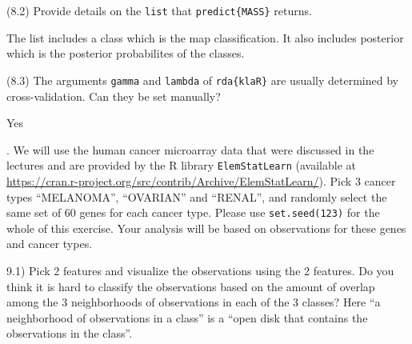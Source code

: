 \documentclass[
  11pt,
]{article}
\newenvironment{Shaded}{\begin{snugshade}}{\end{snugshade}}
\newcommand{\AttributeTok}[1]{\textcolor[rgb]{0.77,0.63,0.00}{#1}}
\newcommand{\ConstantTok}[1]{\textcolor[rgb]{0.00,0.00,0.00}{#1}}
\newcommand{\DecValTok}[1]{\textcolor[rgb]{0.00,0.00,0.81}{#1}}
\newcommand{\FunctionTok}[1]{\textcolor[rgb]{0.00,0.00,0.00}{#1}}
\newcommand{\NormalTok}[1]{#1}
\newcommand{\OtherTok}[1]{\textcolor[rgb]{0.56,0.35,0.01}{#1}}
\newcommand{\SpecialCharTok}[1]{\textcolor[rgb]{0.00,0.00,0.00}{#1}}
\newcommand{\StringTok}[1]{\textcolor[rgb]{0.31,0.60,0.02}{#1}}
\begin{document}
(8.2) Provide details on the \texttt{list} that \texttt{predict\{MASS\}}
returns.

The list includes a class which is the map classification. It also
includes posterior which is the posterior probabilites of the classes.

(8.3) The arguments \texttt{gamma} and \texttt{lambda} of
\texttt{rda\{klaR\}} are usually determined by cross-validation. Can
they be set manually?

Yes

. We will use the human cancer microarray data that were discussed in
the lectures and are provided by the R library \texttt{ElemStatLearn}
(available at
\url{https://cran.r-project.org/src/contrib/Archive/ElemStatLearn/}).
Pick 3 cancer types ``MELANOMA'', ``OVARIAN'' and ``RENAL'', and
randomly select the same set of \(60\) genes for each cancer type.
Please use \texttt{set.seed(123)} for the whole of this exercise. Your
analysis will be based on observations for these genes and cancer types.

9.1) Pick 2 features and visualize the observations using the 2
features. Do you think it is hard to classify the observations based on
the amount of overlap among the 3 neighborhoods of observations in each
of the 3 classes? Here ``a neighborhood of observations in a class'' is
a ``open disk that contains the observations in the class''.

\begin{Shaded}
\end{Shaded}
\end{document}
